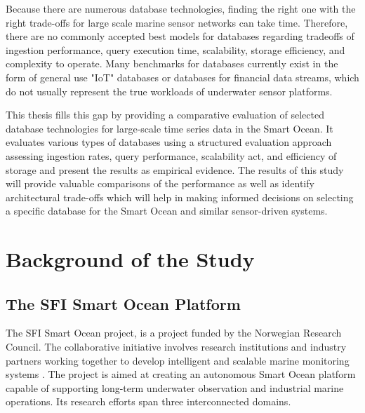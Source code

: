 Because there are numerous database technologies, finding the right one with the right trade-offs for large scale marine sensor networks can take time. Therefore, there are no commonly accepted best models for databases regarding tradeoffs of ingestion performance, query execution time, scalability, storage efficiency, and complexity to operate. Many benchmarks for databases currently exist in the form of general use "IoT" databases or databases for financial data streams, which do not usually represent the true workloads of underwater sensor platforms.

This thesis fills this gap by providing a comparative evaluation of selected database technologies for large-scale time series data in the Smart Ocean. It evaluates various types of databases using a structured evaluation approach assessing ingestion rates, query performance, scalability act, and efficiency of storage and present the results as empirical evidence. The results of this study will provide valuable comparisons of the performance as well as identify architectural trade-offs which will help in making informed decisions on selecting a specific database for the Smart Ocean and similar sensor-driven systems.


\section{Background of the Study}

\subsection{The SFI Smart Ocean Platform}
The SFI Smart Ocean project, is a project funded by the Norwegian Research Council. The collaborative initiative involves research institutions and industry partners working together to develop intelligent and scalable marine monitoring systems \cite{SFI_Smart_Ocean_About}. The project is aimed at creating an autonomous Smart Ocean platform capable of supporting long-term underwater observation and industrial marine operations. Its research efforts span three interconnected domains. 

